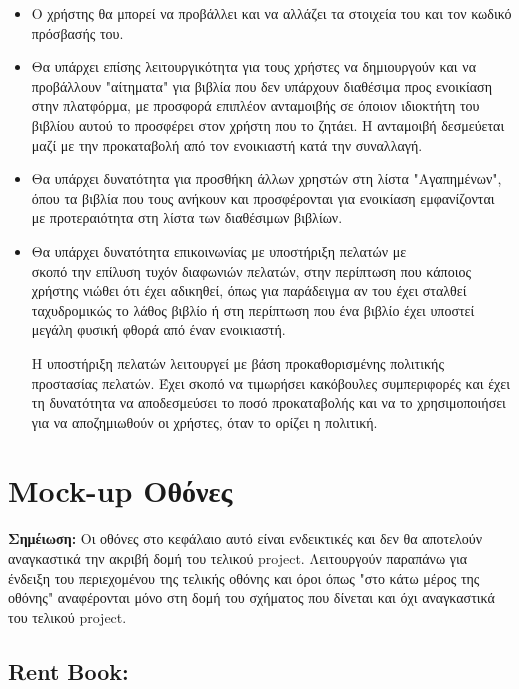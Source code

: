 \documentclass[12pt,a4paper]{article}
\begin{document}
\begin{itemize}
	\item Ο χρήστης θα μπορεί να προβάλλει και να αλλάζει τα στοιχεία του και τον κωδικό πρόσβασής του.

	\item Θα υπάρχει επίσης λειτουργικότητα για τους χρήστες να δημιουργούν και να προβάλλουν "αίτηματα" για βιβλία που δεν υπάρχουν διαθέσιμα προς ενοικίαση στην πλατφόρμα, με προσφορά επιπλέον ανταμοιβής σε όποιον ιδιοκτήτη του βιβλίου αυτού το προσφέρει στον χρήστη που το ζητάει. Η ανταμοιβή δεσμεύεται μαζί με την προκαταβολή από τον ενοικιαστή κατά την συναλλαγή.

	\item Θα υπάρχει δυνατότητα για προσθήκη άλλων χρηστών στη λίστα "Αγαπημένων", όπου τα βιβλία που τους ανήκουν και προσφέρονται για ενοικίαση εμφανίζονται με προτεραιότητα στη λίστα των διαθέσιμων βιβλίων.

	\item Θα υπάρχει δυνατότητα επικοινωνίας με υποστήριξη πελατών με \\σκοπό την επίλυση τυχόν διαφωνιών πελατών, στην περίπτωση που κάποιος χρήστης νιώθει ότι έχει αδικηθεί, όπως για παράδειγμα αν του έχει σταλθεί ταχυδρομικώς το λάθος βιβλίο ή στη περίπτωση που ένα βιβλίο έχει υποστεί μεγάλη φυσική φθορά από έναν ενοικιαστή. 

		Η υποστήριξη πελατών λειτουργεί με βάση προκαθορισμένης πολιτικής προστασίας πελατών. Έχει σκοπό να τιμωρήσει κακόβουλες συμπεριφορές και έχει τη δυνατότητα να αποδεσμεύσει το ποσό προκαταβολής και να το χρησιμοποιήσει για να αποζημιωθούν οι χρήστες, όταν το ορίζει η πολιτική.

\end{itemize}

\section{Mock-up Οθόνες}

\textbf{Σημέιωση:} Οι οθόνες στο κεφάλαιο αυτό είναι ενδεικτικές και δεν θα αποτελούν αναγκαστικά την ακριβή δομή του τελικού project. Λειτουργούν παραπάνω για ένδειξη του περιεχομένου της τελικής οθόνης και όροι όπως "στο κάτω μέρος της οθόνης" αναφέρονται μόνο στη δομή του σχήματος που δίνεται και όχι αναγκαστικά του τελικού project.

\subsection{Rent Book:}
\end{document}
